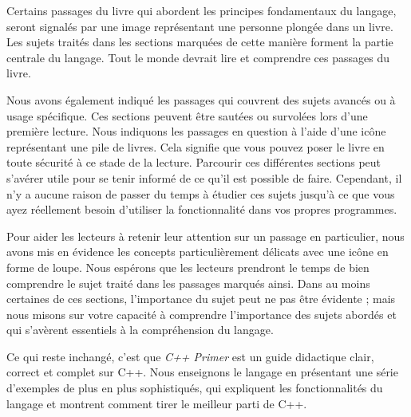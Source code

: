 \documentclass[a4paper,18pt,twoside]{report}
\begin{document}
Certains passages du livre qui abordent les principes fondamentaux du langage, seront signalés par une image représentant une personne plongée dans un livre. Les sujets traités dans les sections marquées de cette manière forment la partie centrale du langage. Tout le monde devrait lire et comprendre ces passages du livre.

Nous avons également indiqué les passages qui couvrent des sujets avancés ou à usage spécifique. Ces sections peuvent être sautées ou survolées lors d'une première lecture. Nous indiquons les passages en question à l'aide d'une icône représentant une pile de livres. Cela signifie que vous pouvez poser le livre en toute sécurité à ce stade de la lecture. Parcourir ces différentes sections peut s'avérer utile pour se tenir informé de ce qu'il est possible de faire. Cependant, il n'y a aucune raison de passer du temps à étudier ces sujets jusqu'à ce que vous ayez réellement besoin d'utiliser la fonctionnalité dans vos propres programmes.

Pour aider les lecteurs à retenir leur attention sur un passage en particulier, nous avons mis en évidence les concepts particulièrement délicats avec une icône en forme de loupe. Nous espérons que les lecteurs prendront le temps de bien comprendre le sujet traité dans les passages marqués ainsi. Dans au moins certaines de ces sections, l'importance du sujet peut ne pas être évidente ; mais nous misons sur votre capacité à comprendre l'importance des sujets abordés et qui s'avèrent essentiels à la compréhension du langage.

Ce qui reste inchangé, c'est que \textit{C++ Primer} est un guide didactique clair, correct et complet sur C++. Nous enseignons le langage en présentant une série d'exemples de plus en plus sophistiqués, qui expliquent les fonctionnalités du langage et montrent comment tirer le meilleur parti de C++.
\end{document}
